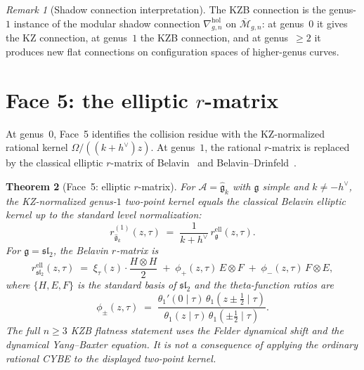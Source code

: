 \documentclass[11pt]{article}
\theoremstyle{plain}
\newtheorem{theorem}{Theorem}[section]
\theoremstyle{definition}
\theoremstyle{remark}
\newtheorem{remark}[theorem]{Remark}
\newcommand{\fg}{\mathfrak{g}}
\newcommand{\fsl}{\mathfrak{sl}}
\newcommand{\cA}{\mathcal{A}}
\newcommand{\Mbar}{\overline{\mathcal{M}}}
\numberwithin{equation}{section}
\begin{document}
\begin{remark}[Shadow connection interpretation]\label{rem:shadow}
The KZB connection is the genus-$1$ instance of the modular shadow
connection $\nabla^{\mathrm{hol}}_{g,n}$ on $\Mbar_{g,n}$: at
genus~$0$ it gives the KZ connection, at genus~$1$ the KZB
connection, and at genus~$\geq 2$ it produces new flat connections on
configuration spaces of higher-genus curves.
\end{remark}



\section{Face 5: the elliptic $r$-matrix}\label{sec:r-matrix}

At genus~$0$, Face~5 identifies the collision residue with the
KZ-normalized rational kernel $\Omega/((k+h^\vee)z)$. At genus~$1$, the
rational $r$-matrix is replaced by the classical elliptic $r$-matrix
of Belavin~\cite{Belavin81} and
Belavin--Drinfeld~\cite{BelavinDrinfeld82}.

\begin{theorem}[Face~5: elliptic $r$-matrix]\label{thm:elliptic-r}
For $\cA = \widehat{\fg}_k$ with $\fg$ simple and $k \neq -h^\vee$,
the KZ-normalized genus-$1$ two-point kernel equals the classical
Belavin elliptic kernel up to the standard level normalization:
\begin{equation}\label{eq:elliptic-rmatrix}
r_{\widehat{\fg}_k}^{(1)}(z,\tau)
\;=\;
\frac{1}{k+h^\vee}\,r^{\mathrm{ell}}_\fg(z,\tau).
\end{equation}
For $\fg = \fsl_2$, the Belavin $r$-matrix is
\begin{equation}\label{eq:sl2-elliptic}
r^{\mathrm{ell}}_{\fsl_2}(z,\tau)
\;=\;
\xi_\tau(z)\cdot\frac{H \otimes H}{2}
\;+\;
\phi_+(z,\tau)\,E \otimes F
\;+\;
\phi_-(z,\tau)\,F \otimes E,
\end{equation}
where $\{H,E,F\}$ is the standard basis of $\fsl_2$ and the
theta-function ratios are
\begin{equation}\label{eq:phi-pm}
\phi_\pm(z,\tau)
\;=\;
\frac{\theta_1'(0\mid\tau)\,
 \theta_1(z \pm \tfrac{1}{2}\mid\tau)}%
{\theta_1(z\mid\tau)\,\theta_1(\pm\tfrac{1}{2}\mid\tau)}.
\end{equation}
The full \(n\geq3\) KZB flatness statement uses the Felder dynamical
shift and the dynamical Yang--Baxter equation. It is not a consequence
of applying the ordinary rational CYBE to the displayed two-point
kernel.
\end{theorem}
\end{document}
